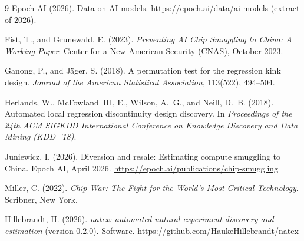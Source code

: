 \documentclass[11pt]{article}
\begin{document}
\begin{thebibliography}{9}
Epoch AI (2026).
Data on AI models.
\url{https://epoch.ai/data/ai-models} (extract of 2026).

Fist, T., and Grunewald, E. (2023).
\emph{Preventing AI Chip Smuggling to China: A Working Paper}.
Center for a New American Security (CNAS), October 2023.

Ganong, P., and J\"ager, S. (2018).
A permutation test for the regression kink design.
\emph{Journal of the American Statistical Association}, 113(522), 494--504.

Herlands, W., McFowland~III, E., Wilson, A.~G., and Neill, D.~B. (2018).
Automated local regression discontinuity design discovery.
In \emph{Proceedings of the 24th ACM SIGKDD International Conference on
Knowledge Discovery and Data Mining (KDD~'18)}.

Juniewicz, I. (2026).
Diversion and resale: Estimating compute smuggling to China.
Epoch AI, April 2026.
\url{https://epoch.ai/publications/chip-smuggling}

Miller, C. (2022).
\emph{Chip War: The Fight for the World's Most Critical Technology}.
Scribner, New York.

Hillebrandt, H. (2026).
\emph{natex: automated natural-experiment discovery and estimation} (version
0.2.0). Software.
\url{https://github.com/HaukeHillebrandt/natex}

\end{thebibliography}
\end{document}
